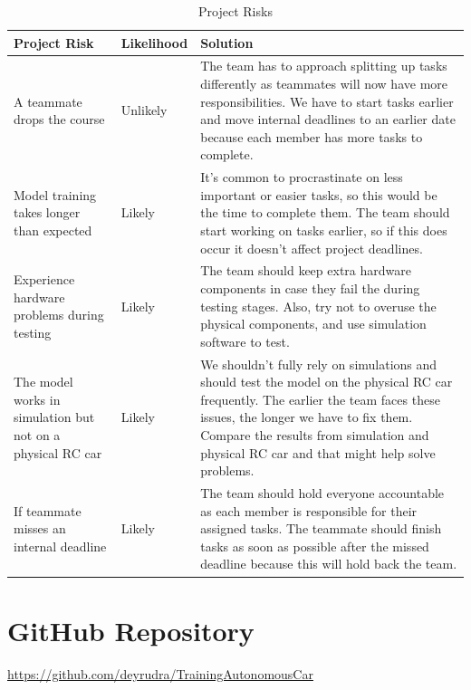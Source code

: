 \documentclass{article} %
\begin{document}
\begin{table}[H]
\caption{Project Risks}
\centering
\begin{tabular}{|p{4cm}|p{2.5cm}|p{7cm}|}
\hline
\textbf{Project Risk} & \textbf{Likelihood} & \textbf{Solution} \\ \hline
A teammate drops the course & Unlikely & The team has to approach splitting up tasks differently as teammates will now have more responsibilities. We have to start tasks earlier and move internal deadlines to an earlier date because each member has more tasks to complete. \\ \hline
Model training takes longer than expected & Likely & It’s common to procrastinate on less important or easier tasks, so this would be the time to complete them. The team should start working on tasks earlier, so if this does occur it doesn’t affect project deadlines. \\ \hline
Experience hardware problems during testing & Likely & The team should keep extra hardware components in case they fail the during testing stages. Also, try not to overuse the physical components, and use simulation software to test. \\ \hline
The model works in simulation but not on a physical RC car & Likely & We shouldn’t fully rely on simulations and should test the model on the physical RC car frequently. The earlier the team faces these issues, the longer we have to fix them. Compare the results from simulation and physical RC car and that might help solve problems. \\ \hline
If teammate misses an internal deadline & Likely & The team should hold everyone accountable as each member is responsible for their assigned tasks. The teammate should finish tasks as soon as possible after the missed deadline because this will hold back the team. \\ \hline
\end{tabular}
\end{table}

\section{GitHub Repository}
\url{https://github.com/deyrudra/TrainingAutonomousCar}
\\\\\\\\\\\\\\\\\\\\\\\\\\\\\\\\

\label{last_page}



\end{document}
